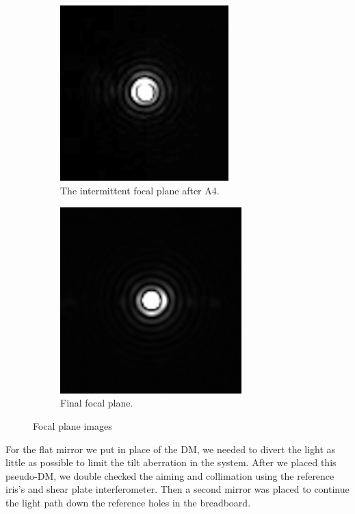 \begin{figure}[H]
\centering
\begin{subfigure}{.5\textwidth}
  \centering
  \includegraphics[width=6.5cm]{Figures/new_int_focal_plane.jpg}
  \caption{The intermittent focal plane after A4.}
  \label{fig:int_focal_plane}
\end{subfigure}%
\begin{subfigure}{.5\textwidth}
  \centering
  \includegraphics[width=7cm]{Figures/final_focal.jpg}
  \caption{Final focal plane.}
  \label{fig:final_focal}
\end{subfigure}
\caption{Focal plane images}
\label{fig:focal_images}
\end{figure}

For the flat mirror we put in place of the DM, we needed to divert the light as little as possible to limit the tilt aberration in the system.  After we placed this pseudo-DM, we double checked the aiming and collimation using the reference iris's and shear plate interferometer.  Then a second mirror was placed to continue the light path down the reference holes in the breadboard.  



